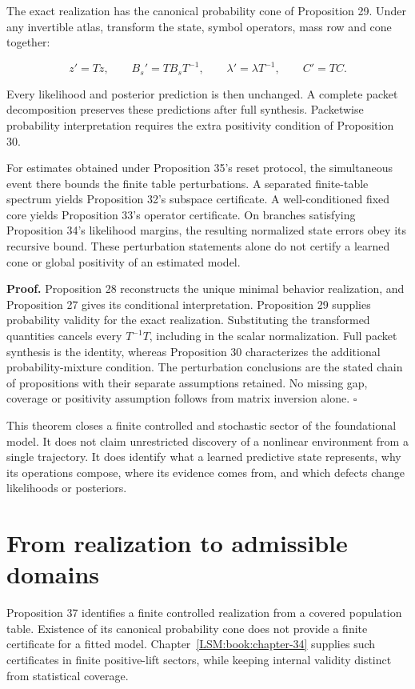 The exact realization has the canonical probability cone of Proposition
29. Under any invertible atlas, transform the state, symbol operators,
mass row and cone together:

\[
z'=Tz,\qquad B_s'=TB_sT^{-1},\qquad
\lambda'=\lambda T^{-1},\qquad C'=TC.
\]

Every likelihood and posterior prediction is then unchanged. A complete
packet decomposition preserves these predictions after full synthesis.
Packetwise probability interpretation requires the extra positivity
condition of Proposition 30.

For estimates obtained under Proposition 35's reset protocol, the
simultaneous event there bounds the finite table perturbations. A
separated finite-table spectrum yields Proposition 32's subspace
certificate. A well-conditioned fixed core yields Proposition 33's
operator certificate. On branches satisfying Proposition 34's likelihood
margins, the resulting normalized state errors obey its recursive bound.
These perturbation statements alone do not certify a learned cone or
global positivity of an estimated model.

\textbf{Proof.} Proposition 28 reconstructs the unique minimal behavior
realization, and Proposition 27 gives its conditional interpretation.
Proposition 29 supplies probability validity for the exact realization.
Substituting the transformed quantities cancels every \(T^{-1}T\),
including in the scalar normalization. Full packet synthesis is the
identity, whereas Proposition 30 characterizes the additional
probability-mixture condition. The perturbation conclusions are the
stated chain of propositions with their separate assumptions retained.
No missing gap, coverage or positivity assumption follows from matrix
inversion alone. \(\square\)

This theorem closes a finite controlled and stochastic sector of the
foundational model. It does not claim unrestricted discovery of a
nonlinear environment from a single trajectory. It does identify what a
learned predictive state represents, why its operations compose, where
its evidence comes from, and which defects change likelihoods or
posteriors.

\section{From realization to admissible domains}\label{LSM:from-realization-to-admissible-domains}

Proposition 37 identifies a finite controlled realization from a covered
population table. Existence of its canonical probability cone does not
provide a finite certificate for a fitted model. Chapter~\ref{LSM:book:chapter-34} supplies such
certificates in finite positive-lift sectors, while keeping internal
validity distinct from statistical coverage.


